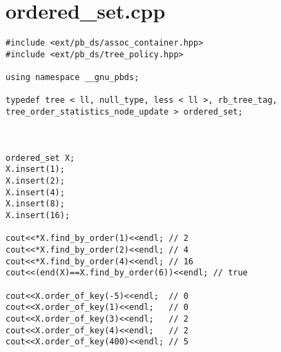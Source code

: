 \documentclass[a4paper,12pt]{report}
\begin{document}
\section{ordered_set.cpp}
\begin{lstlisting}
#include <ext/pb_ds/assoc_container.hpp>
#include <ext/pb_ds/tree_policy.hpp>

using namespace __gnu_pbds;

typedef tree < ll, null_type, less < ll >, rb_tree_tag, tree_order_statistics_node_update > ordered_set;



ordered_set X;
X.insert(1);
X.insert(2);
X.insert(4);
X.insert(8);
X.insert(16);

cout<<*X.find_by_order(1)<<endl; // 2
cout<<*X.find_by_order(2)<<endl; // 4
cout<<*X.find_by_order(4)<<endl; // 16
cout<<(end(X)==X.find_by_order(6))<<endl; // true

cout<<X.order_of_key(-5)<<endl;  // 0
cout<<X.order_of_key(1)<<endl;   // 0
cout<<X.order_of_key(3)<<endl;   // 2
cout<<X.order_of_key(4)<<endl;   // 2
cout<<X.order_of_key(400)<<endl; // 5

\end{lstlisting}
\end{document}
